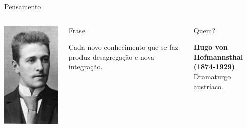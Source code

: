 \documentclass[xcolor=dvipsnames,table]{beamer}
\begin{document}
	\begin{frame}{Pensamento}
		\begin{columns}
		  		\begin{center}
		    		\includegraphics[height=.7\textheight]{images/hugo}
		  		\end{center}
				\begin{block}{Frase}
					\begin{center}
						{\large Cada novo conhecimento que se faz produz desagregação e nova integração.}
					\end{center}
				\end{block}		  		
		  		\begin{block}{Quem?}
		  			\begin{center}
						{\bf Hugo von Hofmannsthal (1874-1929)} \\ Dramaturgo austríaco.
					\end{center}
				\end{block}
		\end{columns}
	\end{frame}
	
\end{document}
